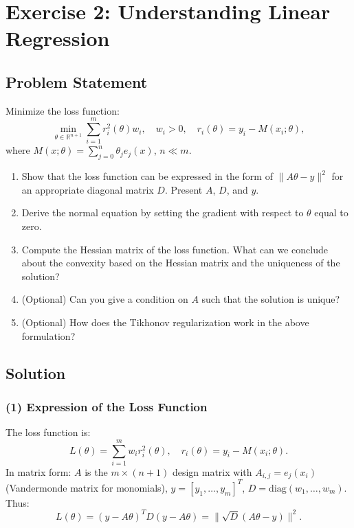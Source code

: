 \documentclass[a4paper,12pt]{article}
\begin{document}
\clearpage

\section*{Exercise 2: Understanding Linear Regression}

\subsection*{Problem Statement}
Minimize the loss function:
\[
\min_{\theta \in \mathbb{R}^{n+1}} \sum_{i=1}^m r_i^2(\theta) w_i, \quad w_i > 0, \quad r_i(\theta) = y_i - M(x_i; \theta),
\]
where \( M(x; \theta) = \sum_{j=0}^n \theta_j e_j(x) \), \( n \ll m \).

\begin{enumerate}
    \item Show that the loss function can be expressed in the form of \( \| A \theta - y \|^2 \) for an appropriate diagonal matrix \( D \). Present \( A \), \( D \), and \( y \).
    \item Derive the normal equation by setting the gradient with respect to \( \theta \) equal to zero.
    \item Compute the Hessian matrix of the loss function. What can we conclude about the convexity based on the Hessian matrix and the uniqueness of the solution?
    \item (Optional) Can you give a condition on \( A \) such that the solution is unique?
    \item (Optional) How does the Tikhonov regularization work in the above formulation?
\end{enumerate}

\subsection*{Solution}

\subsubsection*{(1) Expression of the Loss Function}
The loss function is:
\[
L(\theta) = \sum_{i=1}^m w_i r_i^2(\theta), \quad r_i(\theta) = y_i - M(x_i; \theta).
\]
In matrix form: 
\( A \) is the \( m \times (n+1) \) design matrix with \( A_{i,j} = e_j(x_i) \) (Vandermonde matrix for monomials),  \( y = [y_1, \ldots, y_m]^T \), 
\( D = \text{diag}(w_1, \ldots, w_m) \).
Thus:
\[
L(\theta) = (y - A \theta)^T D (y - A \theta) = \| \sqrt{D} (A \theta - y) \|^2.
\]
\end{document}
